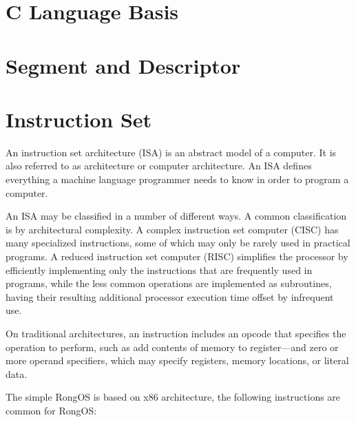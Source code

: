 \documentclass{swfcthesis}
\begin{document}
\section{C Language Basis}
\label{sec:c-language-basis}

\section{Segment and Descriptor}
\label{sec:segment-descriptor}


\section{Instruction Set}
\label{sec:instruction-set}

An instruction set architecture (ISA) is an abstract model of a computer. It is also
referred to as architecture or computer architecture. An ISA defines everything a machine
language programmer needs to know in order to program a computer.

An ISA may be classified in a number of different ways. A common classification is by
architectural complexity. A complex instruction set computer (CISC) has many specialized
instructions, some of which may only be rarely used in practical programs. A reduced
instruction set computer (RISC) simplifies the processor by efficiently implementing only
the instructions that are frequently used in programs, while the less common operations
are implemented as subroutines, having their resulting additional processor execution time
offset by infrequent use.

On traditional architectures, an instruction includes an opcode that specifies the
operation to perform, such as add contents of memory to register—and zero or more operand
specifiers, which may specify registers, memory locations, or literal
data.


The simple RongOS is based on x86 architecture, the following instructions are common
for RongOS:
\end{document}
